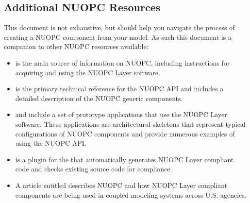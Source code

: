 \subsection{Additional NUOPC Resources}
This document is not exhaustive, but should help you navigate the process of creating
a NUOPC component from your model.  As such this document is a companion to other NUOPC 
resources available:
\begin{itemize}
\item {}
is the main source of information on NUOPC, including instructions
for acquiring and using the NUOPC Layer software.

\item {}
is the primary technical reference for the NUOPC API and includes
a detailed description of the NUOPC generic components.

\item {}
and 
include a set of prototype applications that use the NUOPC Layer software. These
applications are architectural skeletons that represent typical
configurations of NUOPC components and provide numerous examples
of using the NUOPC API.

\item {}
is a plugin for the 
that automatically generates NUOPC Layer compliant code and checks existing
source code for compliance.

\item A 
article entitled 
describes NUOPC and how NUOPC Layer compliant components are being used in coupled modeling
systems across U.S. agencies.

\end{itemize}

